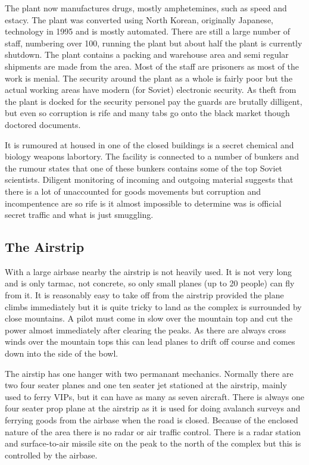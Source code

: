\documentclass{amsart}
\begin{document}
\begin{multicols}{3}
The plant now manufactures drugs, mostly amphetemines, such as speed
and estacy.  The plant was converted using North Korean, originally
Japanese, technology in 1995 and is mostly automated.  There are still
a large number of staff, numbering over 100, running the plant but
about half the plant is currently shutdown.  The plant contains a
packing and warehouse area and semi regular shipments are made from
the area.  Most of the staff are prisoners as most of the work is
menial.  The security around the plant as a whole is fairly poor but
the actual working areas have modern (for Soviet) electronic security.
As theft from the plant is docked for the security personel pay the
guards are brutally dilligent, but even so corruption is rife and many
tabs go onto the black market though doctored documents.

It is rumoured at housed in one of the closed buildings is a secret
chemical and biology weapons labortory.  The facility is connected to
a number of bunkers and the rumour states that one of these bunkers
contains some of the top Soviet scientists.  Diligent monitoring of
incoming and outgoing material suggests that there is a lot of
unaccounted for goods movements but corruption and incompentence are
so rife is it almost impossible to determine was is official secret
traffic and what is just smuggling.

\subsection{The Airstrip}

With a large airbase nearby the airstrip is not heavily used.  It is
not very long and is only tarmac, not concrete, so only small planes
(up to 20 people) can fly from it.  It is reasonably easy to take off
from the airstrip provided the plane climbs immediately but it is
quite tricky to land as the complex is surrounded by close mountains.
A pilot must come in slow over the mountain top and cut the power
almost immediately after clearing the peaks.  As there are always
cross winds over the mountain tops this can lead planes to drift off
course and comes down into the side of the bowl.

The airstip has one hanger with two permanant mechanics.  Normally
there are two four seater planes and one ten seater jet stationed at
the airstrip, mainly used to ferry VIPs, but it can have as many as
seven aircraft.  There is always one four seater prop plane at the
airstrip as it is used for doing avalanch surveys and ferrying goods
from the airbase when the road is closed.  Because of the enclosed
nature of the area there is no radar or air traffic control.  There is
a radar station and surface-to-air missile site on the peak to the
north of the complex but this is controlled by the airbase.


\end{multicols}
\end{document}

